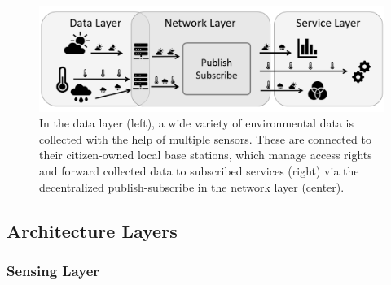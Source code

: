 \begin{figure}[h]
    \centering
    \includegraphics[width=\textwidth]{images/expose-system-architecture.png}
    \caption{In the data layer (left), a wide variety of environmental data is collected with the help of multiple sensors. These are connected to their citizen-owned local base stations, which manage access rights and forward collected data to subscribed services (right) via the decentralized publish-subscribe in the network layer (center).}
    \label{fig:system-architecture-overview} %
\end{figure}


\subsection{Architecture Layers}

\subsubsection{Sensing Layer}


